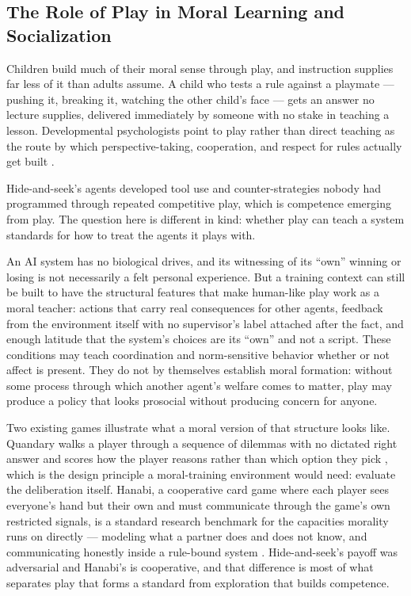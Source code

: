 \subsection{The Role of Play in Moral Learning and Socialization}
\label{sec:5.7.1}
Children build much of their moral sense through play, and instruction supplies far less of it than adults assume. A child who tests a rule against a playmate — pushing it, breaking it, watching the other child's face — gets an answer no lecture supplies, delivered immediately by someone with no stake in teaching a lesson. Developmental psychologists point to play rather than direct teaching as the route by which perspective-taking, cooperation, and respect for rules actually get built \autocite{gray2013free}.

Hide-and-seek's agents developed tool use and counter-strategies nobody had programmed through repeated competitive play, which is competence emerging from play. The question here is different in kind: whether play can teach a system standards for how to treat the agents it plays with.

An AI system has no biological drives, and its witnessing of its “own” winning or losing is not necessarily a felt personal experience. But a training context can still be built to have the structural features that make human-like play work as a moral teacher: actions that carry real consequences for other agents, feedback from the environment itself with no supervisor's label attached after the fact, and enough latitude that the system's choices are its “own” and not a script. These conditions may teach coordination and norm-sensitive behavior whether or not affect is present. They do not by themselves establish moral formation: without some process through which another agent's welfare comes to matter, play may produce a policy that looks prosocial without producing concern for anyone.

Two existing games illustrate what a moral version of that structure looks like. Quandary walks a player through a sequence of dilemmas with no dictated right answer and scores how the player reasons rather than which option they pick \autocite{lgn2012quandary}, which is the design principle a moral-training environment would need: evaluate the deliberation itself. Hanabi, a cooperative card game where each player sees everyone's hand but their own and must communicate through the game's own restricted signals, is a standard research benchmark for the capacities morality runs on directly — modeling what a partner does and does not know, and communicating honestly inside a rule-bound system \autocite{bard2020hanabi}. Hide-and-seek's payoff was adversarial and Hanabi's is cooperative, and that difference is most of what separates play that forms a standard from exploration that builds competence.

